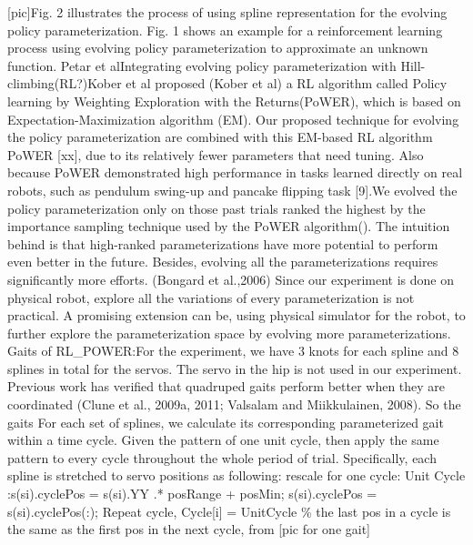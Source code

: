 [pic]Fig. 2 illustrates the process of using spline
representation for the evolving policy parameterization. Fig. 1 shows
an example for a reinforcement learning process using evolving policy
parameterization to approximate an unknown function. Petar et
alIntegrating evolving policy parameterization with
Hill-climbing(RL?)Kober et al proposed (Kober et al) a RL algorithm
called Policy learning by Weighting Exploration with the
Returns(PoWER), which is based on Expectation-Maximization algorithm
(EM). Our proposed technique for evolving the policy parameterization
are combined with this EM-based RL algorithm PoWER [xx], due to its
relatively fewer parameters that need tuning. Also because PoWER
demonstrated high performance in tasks learned directly on real
robots, such as pendulum swing-up and pancake flipping task [9].We
evolved the policy parameterization only on those past trials ranked
the highest by the importance sampling technique used by the PoWER
algorithm(). The intuition behind is that high-ranked
parameterizations have more potential to perform even better in the
future. Besides, evolving all the parameterizations requires
significantly more efforts. (Bongard et al.,2006) Since our experiment
is done on physical robot, explore all the variations of every
parameterization is not practical. A promising extension can be, using
physical simulator for the robot, to further explore the
parameterization space by evolving more parameterizations. Gaits of
RL\_POWER:For the experiment, we have 3 knots for each spline and 8
splines in total for the servos. The servo in the hip is not used in
our experiment. Previous work has verified that quadruped gaits
perform better when they are coordinated (Clune et al., 2009a, 2011;
Valsalam and Miikkulainen, 2008). So the gaits For each set of
splines, we calculate its corresponding parameterized gait within a
time cycle. Given the pattern of one unit cycle, then apply the same
pattern to every cycle throughout the whole period of
trial. Specifically, each spline is stretched to servo positions as
following: rescale for one cycle: Unit Cycle :s(si).cyclePos =
s(si).YY .* posRange + posMin; s(si).cyclePos = s(si).cyclePos(:);
Repeat cycle, Cycle[i] = UnitCycle \% the last pos in a cycle is the
same as the first pos in the next cycle, from [pic for one gait]

